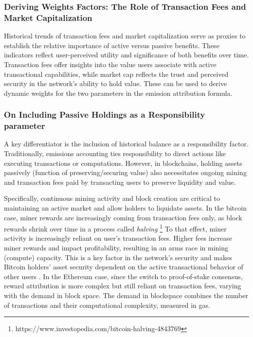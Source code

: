 \documentclass[11pt]{report}
\begin{document}
\subsubsection*{Deriving Weights Factors: The Role of Transaction Fees and Market Capitalization}
Historical trends of transaction fees and market capitalization serve as proxies to establish the relative importance of active versus passive benefits. These indicators reflect user-perceived utility and significance of both benefits over time. Transaction fees offer insights into the value users associate with active transactional capabilities, while market cap reflects the trust and perceived security in the network's ability to hold value. These can be used to derive dynamic weights for the two parameters in the emission attribution formula.



\subsubsection*{On Including Passive Holdings as a Responsibility parameter}
A key differentiator is the inclusion of historical balance as a responsibility factor. Traditionally, emissions accounting ties responsibility to direct actions like executing transactions or computations.  However, in blockchains, holding assets passively (function of preserving/securing value) also necessitates ongoing mining and transaction fees paid by transacting users to preserve liquidity and value.


Specifically, continuous mining activity and block creation are critical to maintaining an active market and allow holders to liquidate assets. In the bitcoin case, miner rewards are increasingly coming from transaction fees only, as block rewards shrink over time in a process called \textit{halving} \footnote{https://www.investopedia.com/bitcoin-halving-4843769} To that effect, miner activity is increasingly reliant on user's transaction fees. Higher fees increase miner rewards and impact profitability, resulting in an arms race in mining (compute) capacity. This is a key factor in the network's security and makes Bitcoin holders' asset security dependent on the active transactional behavior of other users \cite{easleyMiningMarketsEvolution2019}. In the Ethereum case, since the switch to proof-of-stake consensus, reward attribution is more complex but still reliant on transaction fees, varying with the demand in block space. The demand in blockspace combines the number of transactions and their computational complexity, measured in gas.
\end{document}
